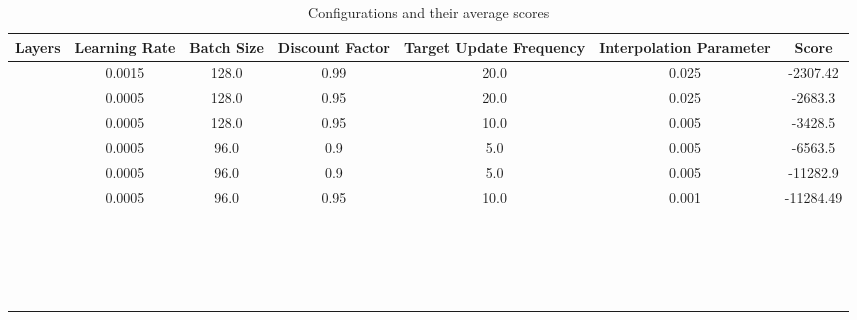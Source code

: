 \begin{table}[h]
\centering
\begin{tabular}{|c|c|c|c|c|c|c|}
\hline
Layers & Learning Rate & Batch Size & Discount Factor & Target Update Frequency & Interpolation Parameter & Score \\
\hline
[128.0, 256.0, 32.0] & 0.0015 & 128.0 & 0.99 & 20.0 & 0.025 & -2307.42 \\
\hline
[128.0, 256.0, 64.0] & 0.0005 & 128.0 & 0.95 & 20.0 & 0.025 & -2683.3 \\
\hline
[128.0, 256.0, 64.0] & 0.0005 & 128.0 & 0.95 & 10.0 & 0.005 & -3428.5 \\
\hline
[128.0, 256.0, 32.0] & 0.0005 & 96.0 & 0.9 & 5.0 & 0.005 & -6563.5 \\
\hline
[128.0, 256.0, 64.0] & 0.0005 & 96.0 & 0.9 & 5.0 & 0.005 & -11282.9 \\
\hline
[128.0, 256.0, 32.0] & 0.0005 & 96.0 & 0.95 & 10.0 & 0.001 & -11284.49 \\
\hline
 &  &  &  &  \\
\hline
 &  &  &  &  \\
\hline
 &  &  &  &  \\
\hline
 &  &  &  &  \\
\hline
 &  &  &  &  \\
\hline
 &  &  &  &  \\
\hline
 &  &  &  &  \\
\hline
 &  &  &  &  \\
\hline
 &  &  &  &  \\
\hline
 &  &  &  &  \\
\hline
 &  &  &  &  \\
\hline
 &  &  &  &  \\
\hline
 &  &  &  &  \\
\hline
 &  &  &  &  \\
\hline
 &  &  &  &  \\
\hline
 &  &  &  &  \\
\hline
 &  &  &  &  \\
\hline
 &  &  &  &  \\
\hline
 &  &  &  &  \\
\hline
\end{tabular}
\caption{Configurations and their average scores}
\label{tab:config_scores}
\end{table}
